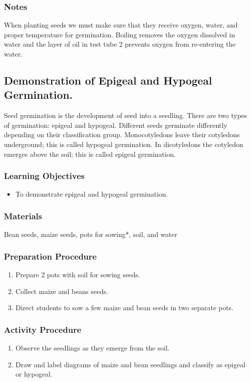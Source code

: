 \subsubsection*{Notes}
When planting seeds we must make sure that they receive oxygen, water, and proper temperature for germination. Boiling removes the oxygen dissolved in water and the layer of oil in test tube 2 prevents oxygen from re-entering the water.

\subsection{Demonstration of Epigeal and Hypogeal Germination.}
Seed germination is the development of seed into a seedling. There are two types of germination: epigeal and hypogeal. Different seeds germinate differently depending on their classification group. Monocotyledons leave their cotyledons underground; this is called hypogeal germination. In dicotyledons the cotyledon emerges above the soil; this is called epigeal germination.

\subsubsection*{Learning Objectives}
\begin{itemize}
\item{To demonstrate epigeal and hypogeal germination.}
\end{itemize}

\subsubsection*{Materials}
Bean seeds, maize seeds, pots for sowing*, soil, and water

\subsubsection*{Preparation Procedure}
\begin{enumerate}
\item{Prepare 2 pots with soil for sowing seeds.}
\item{Collect maize and beans seeds.}
\item{Direct students to sow a few maize and bean seeds in two separate pots.}
\end{enumerate}

\subsubsection*{Activity Procedure}
\begin{enumerate}
\item{Observe the seedlings as they emerge from the soil.}
\item{Draw and label diagrams of maize and bean seedlings and classify as epigeal or hypogeal.}
\end{enumerate}

